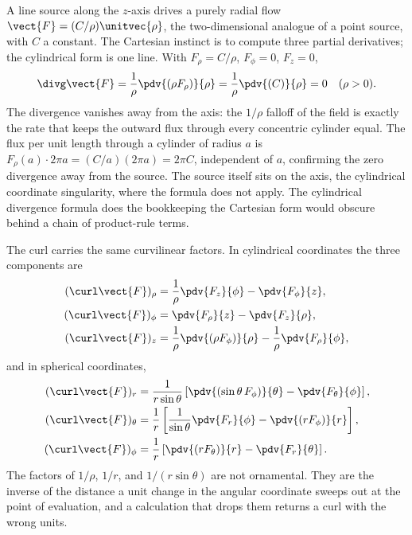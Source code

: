 \begin{example}
A line source along the $z$-axis drives a purely radial flow
$\vect{F} = (C/\rho)\unitvec{\rho}$, the two-dimensional analogue of a
point source, with $C$ a constant. The Cartesian instinct is to
compute three partial derivatives; the cylindrical form is one line.
With $F_{\rho} = C/\rho$, $F_{\phi} = 0$, $F_{z} = 0$,
\[
\divg\vect{F} = \frac{1}{\rho}\pdv{(\rho F_{\rho})}{\rho} =
\frac{1}{\rho}\pdv{(C)}{\rho} = 0 \quad(\rho > 0).
\]
The divergence vanishes away from the axis: the $1/\rho$ falloff of
the field is exactly the rate that keeps the outward flux through
every concentric cylinder equal. The flux per unit length through a
cylinder of radius $a$ is $F_{\rho}(a)\cdot 2\pi a = (C/a)(2\pi a) =
2\pi C$, independent of $a$, confirming the zero divergence away from
the source. The source itself sits on the axis, the cylindrical
coordinate singularity, where the formula does not apply. The
cylindrical divergence formula does the bookkeeping the Cartesian
form would obscure behind a chain of product-rule terms.
\end{example}

The curl carries the same curvilinear factors. In cylindrical
coordinates the three components are
\begin{align*}
(\curl\vect{F})_{\rho} &= \frac{1}{\rho}\pdv{F_{z}}{\phi} -
  \pdv{F_{\phi}}{z}, \\
(\curl\vect{F})_{\phi} &= \pdv{F_{\rho}}{z} - \pdv{F_{z}}{\rho}, \\
(\curl\vect{F})_{z} &= \frac{1}{\rho}\pdv{(\rho F_{\phi})}{\rho} -
  \frac{1}{\rho}\pdv{F_{\rho}}{\phi},
\end{align*}
and in spherical coordinates,
\begin{align*}
(\curl\vect{F})_{r} &= \frac{1}{r\sin\theta}\left[
  \pdv{(\sin\theta\,F_{\phi})}{\theta} - \pdv{F_{\theta}}{\phi}\right], \\
(\curl\vect{F})_{\theta} &= \frac{1}{r}\left[\frac{1}{\sin\theta}
  \pdv{F_{r}}{\phi} - \pdv{(r F_{\phi})}{r}\right], \\
(\curl\vect{F})_{\phi} &= \frac{1}{r}\left[\pdv{(r F_{\theta})}{r} -
  \pdv{F_{r}}{\theta}\right].
\end{align*}
The factors of $1/\rho$, $1/r$, and $1/(r\sin\theta)$ are not
ornamental. They are the inverse of the distance a unit change in the
angular coordinate sweeps out at the point of evaluation, and a
calculation that drops them returns a curl with the wrong units.


